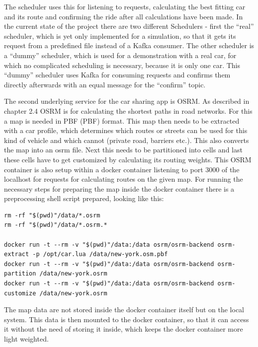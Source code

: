 The scheduler uses this for listening to requests, calculating the best fitting car and its route and confirming the ride after all calculations have been made. In the current state of the project there are two different Schedulers - first the ``real'' scheduler, which is yet only implemented for a simulation, so that it gets its request from a predefined file instead of a Kafka consumer. The other scheduler is a ``dummy'' scheduler, which is used for a demonstration with a real car, for which no complicated scheduling is necessary, because it is only one car. This ``dummy'' scheduler uses Kafka for consuming requests and confirms them directly afterwards with an equal message for the ``confirm'' topic.


The second underlying service for the car sharing app is OSRM. As described in chapter 2.4 OSRM is for calculating the shortest paths in road networks. For this a map is needed in \acs{PBF} (\acl{PBF}) format. This map then needs to be extracted with a car profile, which determines which routes or streets can be used for this kind of vehicle and which cannot (private road, barriers etc.). This also converts the map into an osrm file. Next this needs to be partitioned into cells and last these cells have to get customized by calculating its routing weights. This OSRM container is also setup within a docker container listening to port 3000 of the localhost for requests for calculating routes on the given map. For running the necessary steps for preparing the map inside the docker container there is a preprocessing shell script prepared, looking like this:


\begin{lstlisting}
rm -rf "$(pwd)"/data/*.osrm
rm -rf "$(pwd)"/data/*.osrm.*

docker run -t --rm -v "$(pwd)"/data:/data osrm/osrm-backend osrm-extract -p /opt/car.lua /data/new-york.osm.pbf
docker run -t --rm -v "$(pwd)"/data:/data osrm/osrm-backend osrm-partition /data/new-york.osrm
docker run -t --rm -v "$(pwd)"/data:/data osrm/osrm-backend osrm-customize /data/new-york.osrm
\end{lstlisting}

The map data are not stored inside the docker container itself but on the local system. This data is then mounted to the docker container, so that it can access it without the need of storing it inside, which keeps the docker container more light weighted.

